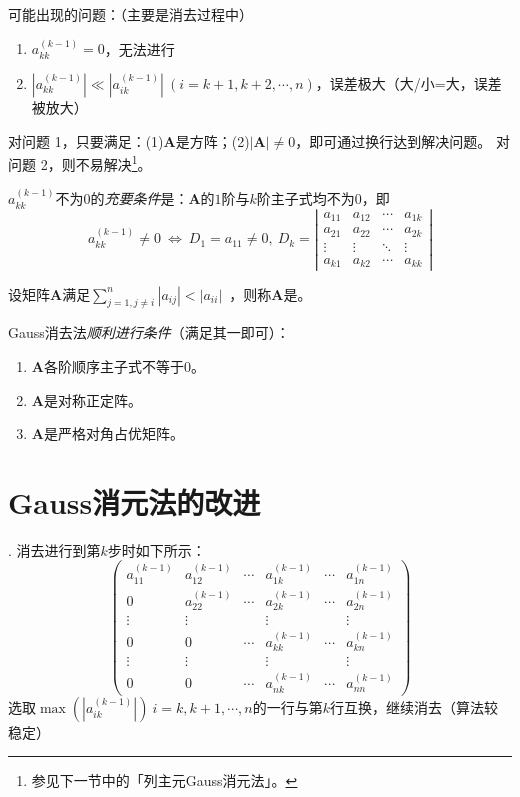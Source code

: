 \entry 可能出现的问题：（主要是消去过程中）
\begin{enumerate}\tl
    \item $a_{kk}^{(k-1)}=0$，无法进行
    \item $|a_{kk}^{(k-1)}|\ll|a_{ik}^{(k-1)}|\ (i=k+1,k+2,\cdots,n)$，误差极大（大/小=大，误差被放大）
\end{enumerate}
对问题 1，只要满足：(1)$\mathbf{A}$是方阵；(2)$|\mathbf{A}|\neq0$，即可通过换行达到解决问题。
对问题 2，则不易解决\footnote{参见下一节中的「列主元Gauss消元法」。}。

\trm $a_{kk}^{(k-1)}$不为$0$的\emph{充要条件}是：$\mathbf{A}$的$1$阶与$k$阶主子式均不为$0$，即
\[a_{kk}^{(k-1)}\neq0\ \Leftrightarrow\ D_1=a_{11}\neq0,\ D_k=\left|\begin{array}{cccc}a_{11}&a_{12}&\cdots&a_{1k}\\a_{21}&a_{22}&\cdots&a_{2k}\\\vdots&\vdots&\ddots&\vdots\\a_{k1}&a_{k2}&\cdots&a_{kk}\end{array}\right|\]

 设矩阵$\mathbf{A}$满足$\sum\limits_{j=1,j\neq i}^n|a_{ij}|<|a_{ii}|$~，则称$\mathbf{A}$是。

\entry Gauss消去法\emph{顺利进行条件}（满足其一即可）：
\begin{enumerate}\tl
    \item $\mathbf{A}$各阶顺序主子式不等于$0$。
    \item $\mathbf{A}$是对称正定阵。
    \item $\mathbf{A}$是严格对角占优矩阵。
\end{enumerate}


\section{Gauss消元法的改进}
\entry {}. 消去进行到第$k$步时如下所示：
\[\begin{pmatrix}a_{11}^{(k-1)}&a_{12}^{(k-1)}&\cdots&a_{1k}^{(k-1)}&\cdots&a_{1n}^{(k-1)}\\0&a_{22}^{(k-1)}&\cdots&a_{2k}^{(k-1)}&\cdots&a_{2n}^{(k-1)}\\\vdots&\vdots&&\vdots&&\vdots\\0&0&\cdots&a_{kk}^{(k-1)}&\cdots&a_{kn}^{(k-1)}\\\vdots&\vdots&&\vdots&&\vdots\\0&0&\cdots&a_{nk}^{(k-1)}&\cdots&a_{nn}^{(k-1)}\end{pmatrix}\]
选取$\max(|a_{ik}^{(k-1)}|)\ i=k,k+1,\cdots,n$的一行与第$k$行互换，继续消去（算法较稳定）

